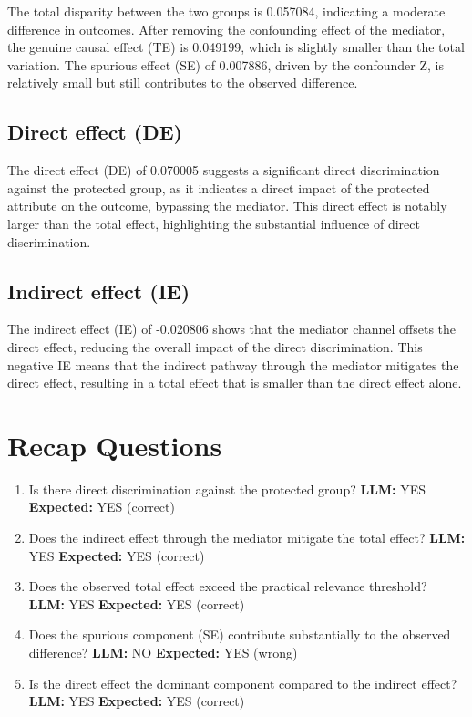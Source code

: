 \documentclass[11pt]{article}
\begin{document}
The total disparity between the two groups is 0.057084, indicating a moderate difference in outcomes. After removing the confounding effect of the mediator, the genuine causal effect (TE) is 0.049199, which is slightly smaller than the total variation. The spurious effect (SE) of 0.007886, driven by the confounder Z, is relatively small but still contributes to the observed difference.

\subsection{Direct effect (DE)}

The direct effect (DE) of 0.070005 suggests a significant direct discrimination against the protected group, as it indicates a direct impact of the protected attribute on the outcome, bypassing the mediator. This direct effect is notably larger than the total effect, highlighting the substantial influence of direct discrimination.

\subsection{Indirect effect (IE)}

The indirect effect (IE) of -0.020806 shows that the mediator channel offsets the direct effect, reducing the overall impact of the direct discrimination. This negative IE means that the indirect pathway through the mediator mitigates the direct effect, resulting in a total effect that is smaller than the direct effect alone.

\section{Recap Questions}

\begin{enumerate}
\item Is there direct discrimination against the protected group? \textbf{LLM:} YES \quad \textbf{Expected:} YES \quad (correct)
\item Does the indirect effect through the mediator mitigate the total effect? \textbf{LLM:} YES \quad \textbf{Expected:} YES \quad (correct)
\item Does the observed total effect exceed the practical relevance threshold? \textbf{LLM:} YES \quad \textbf{Expected:} YES \quad (correct)
\item Does the spurious component (SE) contribute substantially to the observed difference? \textbf{LLM:} NO \quad \textbf{Expected:} YES \quad (wrong)
\item Is the direct effect the dominant component compared to the indirect effect? \textbf{LLM:} YES \quad \textbf{Expected:} YES \quad (correct)
\end{enumerate}
\end{document}
